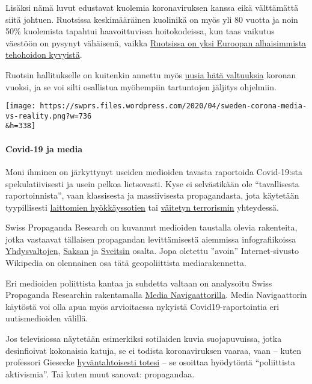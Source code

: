 Lisäksi nämä luvut edustavat kuolemia koronaviruksen kanssa eikä
välttämättä siitä johtuen. Ruotsissa keskimääräinen kuolinikä on myös
yli 80 vuotta ja noin 50\% kuolemista tapahtui haavoittuvissa
hoitokodeissa, kun taas vaikutus väestöön on pysynyt vähäisenä, vaikka
\href{https://link.springer.com/article/10.1007/s00134-012-2627-8}{Ruotsissa
on yksi Euroopan alhaisimmista tehohoidon kyvyistä}.

Ruotsin hallitukselle on kuitenkin annettu myös
\href{https://www.tagesschau.de/faktenfinder/ausland/corona-kursaenderung-schweden-103.html}{uusia
hätä valtuuksia} koronan vuoksi, ja se voi silti osallistua myöhempiin
tartuntojen jäljitys ohjelmiin.

\texttt{[image: https://swprs.files.wordpress.com/2020/04/sweden-corona-media-vs-reality.png?w=736\\\&h=338]}

\hypertarget{covid-19-ja-media}{%
\paragraph{Covid-19 ja media}\label{covid-19-ja-media}}

Moni ihminen on järkyttynyt useiden medioiden tavasta raportoida
Covid-19:sta spekulatiivisesti ja usein pelkoa lietsovasti. Kyse ei
selvästikään ole ``tavallisesta raportoinnista'', vaan klassisesta ja
massiivisesta propagandasta, jota käytetään tyypillisesti
\href{https://swprs.org/propaganda-in-the-war-on-yugoslavia/}{laittomien
hyökkäyssotien} tai
\href{https://www.motherjones.com/politics/2013/01/terror-factory-fbi-trevor-aaronson-book/}{väitetyn
terrorismin} yhteydessä.

Swiss Propaganda Research on kuvannut medioiden taustalla olevia
rakenteita, jotka vastaavat tällaisen propagandan levittämisestä
aiemmissa infografiikoissa
\href{https://swprs.org/the-american-empire-and-its-media/}{Yhdysvaltojen},
\href{https://swprs.org/netzwerk-medien-deutschland/}{Saksan} ja
\href{https://swprs.org/netzwerk-medien-schweiz/}{Sveitsin} osalta. Jopa
oletettu ''avoin'' Internet-sivusto Wikipedia on olennainen osa tätä
geopoliittista mediarakennetta.

Eri medioiden poliittista kantaa ja suhdetta valtaan on analysoitu Swiss
Propaganda Researchin rakentamalla
\href{https://swprs.org/media-navigator/}{Media Navigaattorilla}. Media
Navigaattorin käytöstä voi olla apua myös arvioitaessa nykyistä
Covid19-raportointia eri uutismedioiden välillä.

Jos televisiossa näytetään esimerkiksi sotilaiden kuvia suojapuvuissa,
jotka desinfioivat kokonaisia katuja, se ei todista koronaviruksen
vaaraa, vaan -- kuten professori Giesecke
\href{https://www.addendum.org/coronavirus/interview-johan-giesecke/}{hyväntahtoisesti
totesi} -- se osoittaa hyödytöntä ``poliittista aktivismia''. Tai kuten
muut sanovat: propagandaa.

